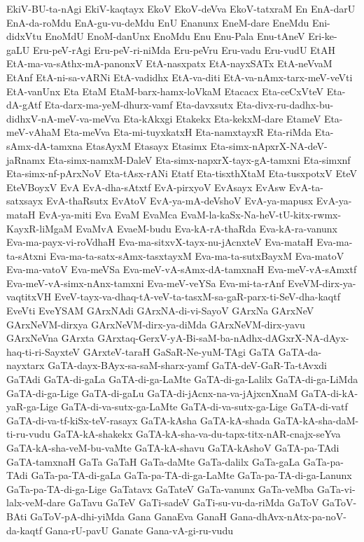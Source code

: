 {EkiV-BU-ta-nAgi
EkiV-kaqtayx
EkoV
EkoV-deVva
EkoV-tatxraM
En
EnA-darU
EnA-da-roMdu
EnA-gu-vu-deMdu
EnU
Enanunx
EneM-dare
EneMdu
Eni-didxVtu
EnoMdU
EnoM-danUnx
EnoMdu
Enu
Enu-Pala
Enu-tAneV
Eri-ke-gaLU
Eru-peV-rAgi
Eru-peV-ri-niMda
Eru-peVru
Eru-vadu
Eru-vudU
EtAH
EtA-ma-va-sAthx-mA-panonxV
EtA-nasxpatx
EtA-nayxSATx
EtA-neVvaM
EtAnf
EtA-ni-sa-vARNi
EtA-vadidhx
EtA-va-diti
EtA-va-nAmx-tarx-meV-veVti
EtA-vanUnx
Eta
EtaM
EtaM-barx-hamx-loVkaM
Etacacx
Eta-ceCxVteV
Eta-dA-gAtf
Eta-darx-ma-yeM-dhurx-vamf
Eta-davxsutx
Eta-divx-ru-dadhx-bu-didhxV-nA-meV-va-meVva
Eta-kAkxgi
Etakekx
Eta-kekxM-dare
EtameV
Eta-meV-vAhaM
Eta-meVva
Eta-mi-tuyxkatxH
Eta-namxtayxR
Eta-riMda
Eta-sAmx-dA-tamxna
EtasAyxM
Etasayx
Etasimx
Eta-simx-nApxrX-NA-deV-jaRnamx
Eta-simx-namxM-DaleV
Eta-simx-napxrX-tayx-gA-tamxni
Eta-simxnf
Eta-simx-nf-pArxNoV
Eta-tAsx-rANi
Etatf
Eta-tisxthXtaM
Eta-tusxpotxV
EteV
EteVBoyxV
EvA
EvA-dha-sAtxtf
EvA-pirxyoV
EvAsayx
EvAsw
EvA-ta-satxsayx
EvA-thaRsutx
EvAtoV
EvA-ya-mA-deVshoV
EvA-ya-mapusx
EvA-ya-mataH
EvA-ya-miti
Eva
EvaM
EvaMca
EvaM-la-kaSx-Na-heV-tU-kitx-rwmx-KayxR-liMgaM
EvaMvA
EvaeM-budu
Eva-kA-rA-thaRda
Eva-kA-ra-vanunx
Eva-ma-payx-vi-roVdhaH
Eva-ma-sitxvX-tayx-nu-jAcnxteV
Eva-mataH
Eva-ma-ta-sAtxni
Eva-ma-ta-satx-sAmx-tasxtayxM
Eva-ma-ta-sutxBayxM
Eva-matoV
Eva-ma-vatoV
Eva-meVSa
Eva-meV-vA-sAmx-dA-tamxnaH
Eva-meV-vA-sAmxtf
Eva-meV-vA-simx-nAnx-tamxni
Eva-meV-veYSa
Eva-mi-ta-rAnf
EveVM-dirx-ya-vaqtitxVH
EveV-tayx-va-dhaq-tA-veV-ta-tasxM-sa-gaR-parx-ti-SeV-dha-kaqtf
EveVti
EveYSAM
GArxNAdi
GArxNA-di-vi-SayoV
GArxNa
GArxNeV
GArxNeVM-dirxya
GArxNeVM-dirx-ya-diMda
GArxNeVM-dirx-yavu
GArxNeVna
GArxta
GArxtaq-GerxV-yA-Bi-saM-ba-nAdhx-dAGxrX-NA-dAyx-haq-ti-ri-SayxteV
GArxteV-taraH
GaSaR-Ne-yuM-TAgi
GaTA
GaTA-da-nayxtarx
GaTA-dayx-BAyx-sa-saM-sharx-yamf
GaTA-deV-GaR-Ta-tAvxdi
GaTAdi
GaTA-di-gaLa
GaTA-di-ga-LaMte
GaTA-di-ga-Lalilx
GaTA-di-ga-LiMda
GaTA-di-ga-Lige
GaTA-di-gaLu
GaTA-di-jAcnx-na-va-jAjxcnXnaM
GaTA-di-kA-yaR-ga-Lige
GaTA-di-va-sutx-ga-LaMte
GaTA-di-va-sutx-ga-Lige
GaTA-di-vatf
GaTA-di-va-tf-kiSx-teV-rasayx
GaTA-kAsha
GaTA-kA-shada
GaTA-kA-sha-daM-ti-ru-vudu
GaTA-kA-shakekx
GaTA-kA-sha-va-du-tapx-titx-nAR-cnajx-seYva
GaTA-kA-sha-veM-bu-vaMte
GaTA-kA-shavu
GaTA-kAshoV
GaTA-pa-TAdi
GaTA-tamxnaH
GaTa
GaTaH
GaTa-daMte
GaTa-dalilx
GaTa-gaLa
GaTa-pa-TAdi
GaTa-pa-TA-di-gaLa
GaTa-pa-TA-di-ga-LaMte
GaTa-pa-TA-di-ga-Lanunx
GaTa-pa-TA-di-ga-Lige
GaTatavx
GaTateV
GaTa-vanunx
GaTa-veMba
GaTa-vi-lalx-veM-dare
GaTavu
GaTeV
GaTi-sadeV
GaTi-su-vu-da-riMda
GaToV
GaToV-BAti
GaToV-pA-dhi-yiMda
Gana
GanaEva
GanaH
Gana-dhAvx-nAtx-pa-noV-da-kaqtf
Gana-rU-pavU
Ganate
Gana-vA-gi-ru-vudu
}
